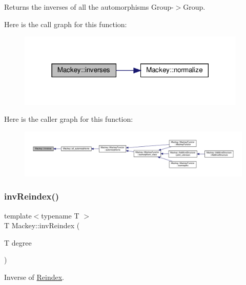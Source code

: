 Returns the inverses of all the automorphisms Group-\/$>$Group. 

Here is the call graph for this function\+:\nopagebreak
\begin{figure}[H]
\begin{center}
\leavevmode
\includegraphics[width=309pt]{namespaceMackey_ac8552763cbbe02f22cedc11c6f8434da_cgraph}
\end{center}
\end{figure}
Here is the caller graph for this function\+:\nopagebreak
\begin{figure}[H]
\begin{center}
\leavevmode
\includegraphics[width=350pt]{namespaceMackey_ac8552763cbbe02f22cedc11c6f8434da_icgraph}
\end{center}
\end{figure}
\mbox{\label{namespaceMackey_a5efb3695c450e4e590b86f20700f726b}} 
\subsubsection{\texorpdfstring{inv\+Reindex()}{invReindex()}\hspace{0.1cm}{\footnotesize\ttfamily [1/2]}}
{\footnotesize\ttfamily template$<$typename T $>$ \\
T Mackey\+::inv\+Reindex (\begin{DoxyParamCaption}\item[{T}]{degree }\end{DoxyParamCaption})\hspace{0.3cm}{\ttfamily [inline]}}



Inverse of \hyperlink{namespaceMackey_a7da73ade3ee83c4ffd614e79242d7c04}{Reindex}. 

